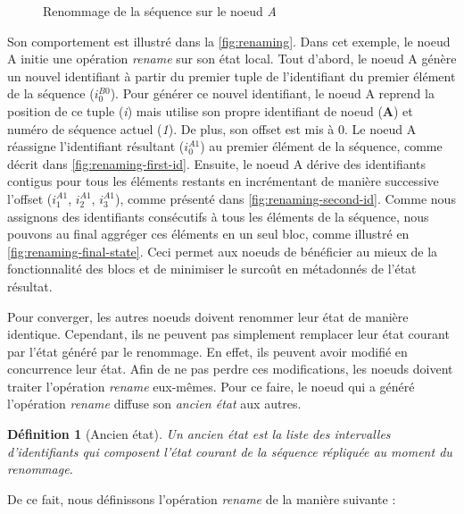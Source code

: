 \documentclass[12pt]{thesul}
\newtheorem{definition}{Définition}
\newcommand{\trm}[1]{\mathit{#1}}
\newcommand{\id}[3]{$\trm{#1}^{\trm{#2}}_{\trm{#3}}$}
\begin{document}
\begin{figure}[t!]
{\begin{minipage}{\linewidth}
          \label{fig:renaming-final-state}
      \end{minipage}}
  \caption{Renommage de la séquence sur le noeud \emph{A}}
  \label{fig:renaming}
\end{figure}

Son comportement est illustré dans la \autoref{fig:renaming}.
Dans cet exemple, le noeud A initie une opération \emph{rename} sur son état local.
Tout d'abord, le noeud A génère un nouvel identifiant à partir du premier tuple de l'identifiant du premier élément de la séquence (\id{i}{B0}{0}).
Pour générer ce nouvel identifiant, le noeud A reprend la position de ce tuple (\emph{i}) mais utilise son propre identifiant de noeud (\textbf{A}) et numéro de séquence actuel (\emph{1}).
De plus, son offset est mis à 0.
Le noeud A réassigne l'identifiant résultant (\id{i}{A1}{0}) au premier élément de la séquence, comme décrit dans \autoref{fig:renaming-first-id}.
Ensuite, le noeud A dérive des identifiants contigus pour tous les éléments restants en incrémentant de manière successive l'offset (\id{i}{A1}{1}, \id{i}{A1}{2}, \id{i}{A1}{3}), comme présenté dans \autoref{fig:renaming-second-id}.
Comme nous assignons des identifiants consécutifs à tous les éléments de la séquence, nous pouvons au final aggréger ces éléments en un seul bloc, comme illustré en \autoref{fig:renaming-final-state}.
Ceci permet aux noeuds de bénéficier au mieux de la fonctionnalité des blocs et de minimiser le surcoût en métadonnés de l'état résultat.

Pour converger, les autres noeuds doivent renommer leur état de manière identique.
Cependant, ils ne peuvent pas simplement remplacer leur état courant par l'état généré par le renommage.
En effet, ils peuvent avoir modifié en concurrence leur état.
Afin de ne pas perdre ces modifications, les noeuds doivent traiter l'opération \emph{rename} eux-mêmes.
Pour ce faire, le noeud qui a généré l'opération \emph{rename} diffuse son \emph{ancien état} aux autres.

\begin{definition}[Ancien état]
  Un \emph{ancien état} est la liste des intervalles d'identifiants qui composent l'état courant de la séquence répliquée au moment du renommage.
\end{definition}

De ce fait, nous définissons l'opération \emph{rename} de la manière suivante :
\end{document}

